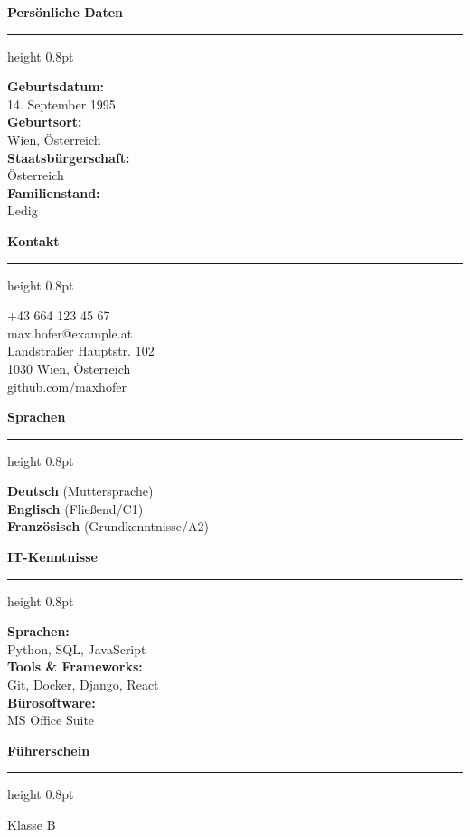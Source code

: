 \documentclass[10pt,a4paper]{article}
\newcommand{\sidebarsection}[1]{%
  \vspace{0.3cm}%
  {\normalsize\bfseries\color{primary}#1}%
  \vspace{0.08cm}%
  \hrule height 0.8pt%
  \vspace{0.15cm}%
}
\begin{document}
\begin{minipage}[t]{0.30\textwidth}
  \begin{center}
  \end{center}
  \vspace{0.1cm}
  
  \sidebarsection{Persönliche Daten}
  \noindent
  \textbf{Geburtsdatum:}\\
  14. September 1995\\[0.12cm]
  \textbf{Geburtsort:}\\
  Wien, Österreich\\[0.12cm]
  \textbf{Staatsbürgerschaft:}\\
  Österreich\\[0.12cm]
  \textbf{Familienstand:}\\
  Ledig
  
  \sidebarsection{Kontakt}
  \noindent
  \makebox[0.5cm][l]{\color{primary}\faPhone} +43 664 123 45 67\\[0.12cm]
  \makebox[0.5cm][l]{\color{primary}\faEnvelope} max.hofer@example.at\\[0.12cm]
  \makebox[0.5cm][l]{\color{primary}\faHome} Landstraßer Hauptstr. 102\\
  \makebox[0.5cm][l]{} 1030 Wien, Österreich\\[0.12cm]
  \makebox[0.5cm][l]{\color{primary}\faGlobe} github.com/maxhofer
  
  \sidebarsection{Sprachen}
  \noindent
  \textbf{Deutsch} (Muttersprache)\\[0.12cm]
  \textbf{Englisch} (Fließend/C1)\\[0.12cm]
  \textbf{Französisch} (Grundkenntnisse/A2)
  
  \sidebarsection{IT-Kenntnisse}
  \noindent
  \textbf{Sprachen:}\\
  Python, SQL, JavaScript\\[0.12cm]
  \textbf{Tools \& Frameworks:}\\
  Git, Docker, Django, React\\[0.12cm]
  \textbf{Bürosoftware:}\\
  MS Office Suite
  
  \sidebarsection{Führerschein}
  \noindent
  Klasse B
\end{minipage}%
\end{document}
